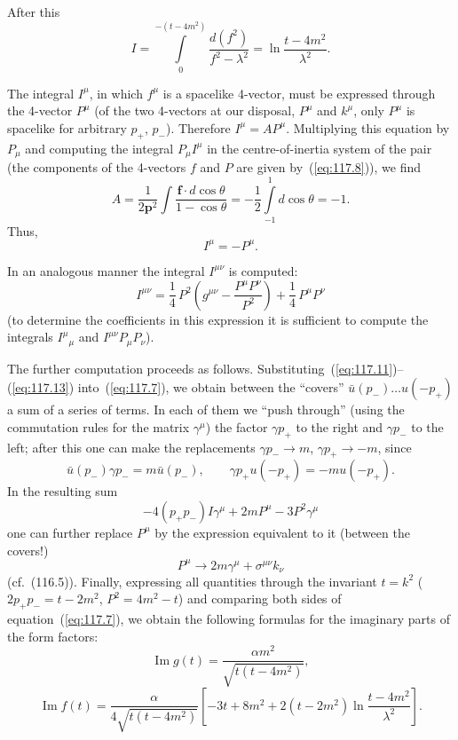 After this
\begin{equation}
I = \int\limits_0^{-(t - 4m^2)} \frac{d(f^2)}{f^2 - \lambda^2} = \ln\frac{t - 4m^2}{\lambda^2}.
\label{eq:117.11}
\end{equation}


The integral $I^\mu$, in which $f^\mu$ is a spacelike 4-vector, must be expressed through the 4-vector $P^\mu$ (of the two 4-vectors at our disposal, $P^\mu$ and $k^\mu$, only $P^\mu$ is spacelike for arbitrary $p_+$, $p_-$). Therefore $I^\mu = AP^\mu$. Multiplying this equation by $P_\mu$ and computing the integral $P_\mu I^\mu$ in the centre-of-inertia system of the pair (the components of the 4-vectors $f$ and $P$ are given by~(\ref{eq:117.8})), we find
\[
A = \frac{1}{2\mathbf{p}^2}\int \frac{\mathbf{f} \cdot d\cos\theta}{1 - \cos\theta} = -\frac{1}{2}\int\limits_{-1}^{1} d\cos\theta = -1.
\]
Thus,
\begin{equation}
I^\mu = -P^\mu.
\label{eq:117.12}
\end{equation}

In an analogous manner the integral $I^{\mu\nu}$ is computed:
\begin{equation}
I^{\mu\nu} = \frac{1}{4}\,P^2\!\left(g^{\mu\nu} - \frac{P^\mu P^\nu}{P^2}\right) + \frac{1}{4}\,P^\mu P^\nu
\label{eq:117.13}
\end{equation}
(to determine the coefficients in this expression it is sufficient to compute the integrals $I^\mu{}_\mu$ and $I^{\mu\nu}P_\mu P_\nu$).

The further computation proceeds as follows. Substituting~(\ref{eq:117.11})--(\ref{eq:117.13}) into~(\ref{eq:117.7}), we obtain between the ``covers'' $\bar{u}(p_-) \ldots u(-p_+)$ a sum of a series of terms. In each of them we ``push through'' (using the commutation rules for the matrix $\gamma^\mu$) the factor $\gamma p_+$ to the right and $\gamma p_-$ to the left; after this one can make the replacements $\gamma p_- \to m$, $\gamma p_+ \to -m$, since
\[
\bar{u}(p_-)\gamma p_- = m\bar{u}(p_-), \qquad \gamma p_+ u(-p_+) = -mu(-p_+).
\]
In the resulting sum
\[
-4(p_+p_-)I\gamma^\mu + 2mP^\mu - 3P^2\gamma^\mu
\]
one can further replace $P^\mu$ by the expression equivalent to it (between the covers!)
\[
P^\mu \to 2m\gamma^\mu + \sigma^{\mu\nu} k_\nu
\]
(cf.~(116.5)). Finally, expressing all quantities through the invariant $t = k^2$ ($2p_+p_- = t - 2m^2$, $P^2 = 4m^2 - t$) and comparing both sides of equation~(\ref{eq:117.7}), we obtain the following formulas for the imaginary parts of the form factors:
\begin{equation}
\operatorname{Im} g(t) = \frac{\alpha m^2}{\sqrt{t(t - 4m^2)}},
\label{eq:117.14}
\end{equation}
\begin{equation}
\operatorname{Im} f(t) = \frac{\alpha}{4\sqrt{t(t - 4m^2)}}\left[-3t + 8m^2 + 2(t - 2m^2)\ln\frac{t - 4m^2}{\lambda^2}\right].
\label{eq:117.15}
\end{equation}

